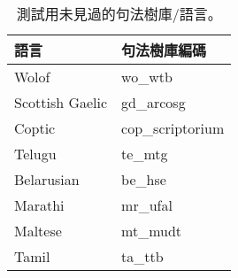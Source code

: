 
\begin{table}[h!]
\centering
    \begin{tabular}[t]{|l l|}
        \hline
        \textbf{語言} & \textbf{句法樹庫編碼} \\
        \hline
        Wolof & wo\_wtb \\
        Scottish Gaelic & gd\_arcosg \\
        Coptic & cop\_scriptorium \\
        Telugu & te\_mtg \\
        Belarusian & be\_hse \\
        Marathi & mr\_ufal \\
        Maltese & mt\_mudt \\
        Tamil & ta\_ttb \\
        \hline
    \end{tabular}
    \caption{測試用未見過的句法樹庫/語言。}
    \label{tab:unseen_languages}
\end{table}